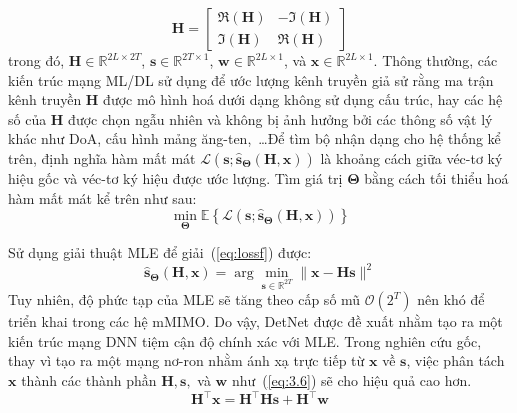 \begin{equation}
\label{eq:matrixtras2}
    \mathbf{H}=\left[\begin{array}{cc}
    \Re(\mathbf{H}) & -\Im(\mathbf{H}) \\
    \Im(\mathbf{H}) & \Re(\mathbf{H})
    \end{array}\right]
\end{equation}
trong đó, $\mathbf{H} \in \mathbb{R}^{2L \times 2T}$, $\mathbf{s} \in \mathbb{R}^{2T \times 1}$, $\mathbf{w} \in \mathbb{R}^{2L \times 1}$, và $\mathbf{x} \in \mathbb{R}^{2L \times 1}$. Thông thường, các kiến trúc mạng ML/DL sử dụng để ước lượng kênh truyền giả sử rằng ma trận kênh truyền $\mathbf{H}$ được mô hình hoá dưới dạng không sử dụng cấu trúc, hay các hệ số của $\mathbf{H}$ được chọn ngẫu nhiên và không bị ảnh hưởng bởi các thông số vật lý khác như DoA, cấu hình mảng ăng-ten,~\ldots Để tìm bộ nhận dạng cho hệ thống kể trên, định nghĩa hàm mất mát $\mathcal{L}\left(\mathbf{s} ; \hat{\mathbf{s}}_{\boldsymbol{\Theta}}(\mathbf{H}, \mathbf{x})\right)$ là khoảng cách giữa véc-tơ ký hiệu gốc và véc-tơ ký hiệu được ước lượng. Tìm giá trị $\boldsymbol{\Theta}$ bằng cách tối thiểu hoá hàm mất mát kể trên như sau:
\begin{equation}
\label{eq:lossf}
\min _{\boldsymbol{\Theta}} \mathbb{E}\left\{\mathcal{L}\left(\mathbf{s} ; \hat{\mathbf{s}}_{\boldsymbol{\Theta}}(\mathbf{H}, \mathbf{x})\right)\right\}
\end{equation}

Sử dụng giải thuật MLE để giải~(\ref{eq:lossf}) được:
\begin{equation}
\label{eq:mle}
\hat{\mathbf{s}}_{\boldsymbol{\Theta}}(\mathbf{H}, \mathbf{x})=\arg \min _{\mathbf{s} \in \mathbb{R}^{2T}}\|\mathbf{x}-\mathbf{H} \mathbf{s}\|^2
\end{equation}
Tuy nhiên, độ phức tạp của MLE sẽ tăng theo cấp số mũ $\mathcal{O}(2^T)$ nên khó để triển khai trong các hệ mMIMO. Do vậy, DetNet được đề xuất nhằm tạo ra một kiến trúc mạng DNN tiệm cận độ chính xác với MLE. Trong nghiên cứu gốc, thay vì tạo ra một mạng nơ-ron nhằm ánh xạ trực tiếp từ $\mathbf{x}$ về $\mathbf{s}$, việc phân tách $\mathbf{x}$ thành các thành phần $\mathbf{H}, \mathbf{s},$ và $\mathbf{w}$ như~(\ref{eq:3.6}) sẽ cho hiệu quả cao hơn.
\begin{equation}
    \label{eq:3.6}
    \mathbf{H}^\top \mathbf{x}=\mathbf{H}^\top \mathbf{H s}+\mathbf{H}^\top \mathbf{w}
\end{equation}

